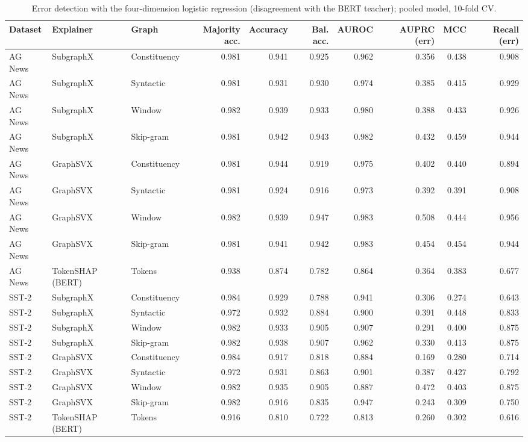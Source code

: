 \begin{table}[H]
\centering
\small
\caption{Error detection with the four-dimension logistic regression (disagreement with the BERT teacher); pooled model, 10-fold CV.}
\label{tab:lr_teacher_agreement}
\begin{tabular}{lllrrrrrrr}
\toprule
Dataset & Explainer & Graph & Majority acc. & Accuracy & Bal. acc. & AUROC & AUPRC (err) & MCC & Recall (err) \\
\midrule
AG News & SubgraphX & Constituency & 0.981 & 0.941 & 0.925 & 0.962 & 0.356 & 0.438 & 0.908 \\
AG News & SubgraphX & Syntactic & 0.981 & 0.931 & 0.930 & 0.974 & 0.385 & 0.415 & 0.929 \\
AG News & SubgraphX & Window & 0.982 & 0.939 & 0.933 & 0.980 & 0.388 & 0.433 & 0.926 \\
AG News & SubgraphX & Skip-gram & 0.981 & 0.942 & 0.943 & 0.982 & 0.432 & 0.459 & 0.944 \\
AG News & GraphSVX & Constituency & 0.981 & 0.944 & 0.919 & 0.975 & 0.402 & 0.440 & 0.894 \\
AG News & GraphSVX & Syntactic & 0.981 & 0.924 & 0.916 & 0.973 & 0.392 & 0.391 & 0.908 \\
AG News & GraphSVX & Window & 0.982 & 0.939 & 0.947 & 0.983 & 0.508 & 0.444 & 0.956 \\
AG News & GraphSVX & Skip-gram & 0.981 & 0.941 & 0.942 & 0.983 & 0.454 & 0.454 & 0.944 \\
AG News & TokenSHAP (BERT) & Tokens & 0.938 & 0.874 & 0.782 & 0.864 & 0.364 & 0.383 & 0.677 \\
SST-2 & SubgraphX & Constituency & 0.984 & 0.929 & 0.788 & 0.941 & 0.306 & 0.274 & 0.643 \\
SST-2 & SubgraphX & Syntactic & 0.972 & 0.932 & 0.884 & 0.900 & 0.391 & 0.448 & 0.833 \\
SST-2 & SubgraphX & Window & 0.982 & 0.933 & 0.905 & 0.907 & 0.291 & 0.400 & 0.875 \\
SST-2 & SubgraphX & Skip-gram & 0.982 & 0.938 & 0.907 & 0.962 & 0.330 & 0.413 & 0.875 \\
SST-2 & GraphSVX & Constituency & 0.984 & 0.917 & 0.818 & 0.884 & 0.169 & 0.280 & 0.714 \\
SST-2 & GraphSVX & Syntactic & 0.972 & 0.931 & 0.863 & 0.901 & 0.387 & 0.427 & 0.792 \\
SST-2 & GraphSVX & Window & 0.982 & 0.935 & 0.905 & 0.887 & 0.472 & 0.403 & 0.875 \\
SST-2 & GraphSVX & Skip-gram & 0.982 & 0.916 & 0.835 & 0.947 & 0.243 & 0.309 & 0.750 \\
SST-2 & TokenSHAP (BERT) & Tokens & 0.916 & 0.810 & 0.722 & 0.813 & 0.260 & 0.302 & 0.616 \\
\bottomrule
\end{tabular}
\end{table}

